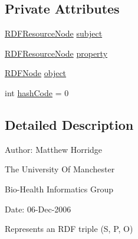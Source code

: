 \subsection*{Private Attributes}
\begin{DoxyCompactItemize}
\item 
\hyperlink{classorg_1_1coode_1_1owlapi_1_1rdf_1_1model_1_1_r_d_f_resource_node}{R\-D\-F\-Resource\-Node} \hyperlink{classorg_1_1coode_1_1owlapi_1_1rdf_1_1model_1_1_r_d_f_triple_a8e8236c19fd75f36b6f395d2505b2443}{subject}
\item 
\hyperlink{classorg_1_1coode_1_1owlapi_1_1rdf_1_1model_1_1_r_d_f_resource_node}{R\-D\-F\-Resource\-Node} \hyperlink{classorg_1_1coode_1_1owlapi_1_1rdf_1_1model_1_1_r_d_f_triple_a6b9f9cd4fed026fa8398be4aa8f736ac}{property}
\item 
\hyperlink{classorg_1_1coode_1_1owlapi_1_1rdf_1_1model_1_1_r_d_f_node}{R\-D\-F\-Node} \hyperlink{classorg_1_1coode_1_1owlapi_1_1rdf_1_1model_1_1_r_d_f_triple_aee655bad73651f8c49524098fc1d8b9f}{object}
\item 
int \hyperlink{classorg_1_1coode_1_1owlapi_1_1rdf_1_1model_1_1_r_d_f_triple_a42887e666e0612fb089f39e9f913d6f2}{hash\-Code} = 0
\end{DoxyCompactItemize}


\subsection{Detailed Description}
Author\-: Matthew Horridge\par
 The University Of Manchester\par
 Bio-\/\-Health Informatics Group\par
 Date\-: 06-\/\-Dec-\/2006\par
\par


Represents an R\-D\-F triple (S, P, O) 

